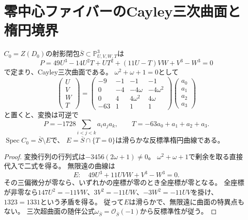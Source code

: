 \section{零中心ファイバーのCayley三次曲面と楕円境界}
\label{sec:quotient-cayley}
\begin{proposition}[選ばれた反標準因子を持つCayley表示]
$C_0=Z(D_0)$の射影閉包$\overline S\subset\mathbb P^3_{U,V,W,T}$は
\[
 P=49U^3-14U^2T+UT^2+(11U-T)VW+V^3-W^3=0
\]
で定まり、Cayley三次曲面である。
$\omega^2+\omega+1=0$として
\[
 \begin{pmatrix}U\\V\\W\\T\end{pmatrix}
 =\begin{pmatrix}
 -9&-1&-1&-1\\
 0&-4&-4\omega&-4\omega^2\\
 0&4&4\omega^2&4\omega\\
 -63&1&1&1
 \end{pmatrix}
 \begin{pmatrix}a_0\\a_1\\a_2\\a_3\end{pmatrix}
\]
と置くと、変換は可逆で
\[
 P=-1728\sum_{i<j<k}a_i a_j a_k,\qquad
 T=-63a_0+a_1+a_2+a_3.
\]
$\operatorname{Spec}C_0=\overline S\setminus E$で、
$E=\overline S\cap\{T=0\}$は滑らかな反標準楕円曲線である。
\end{proposition}
\begin{proof}
変換行列の行列式は$-3456(2\omega+1)\ne0$。
$\omega^2+\omega+1$で剰余を取る直接代入で二式を得る。
無限遠の曲線は
\[
 E:\quad49U^3+11UVW+V^3-W^3=0.
\]
その三偏微分が零なら、いずれかの座標が零のとき全座標が零となる。
全座標が非零なら$147U^2=-11VW$、$3V^2=-11UW$、$-3W^2=-11UV$を掛け、
$1323=1331$という矛盾を得る。
従って$E$は滑らかで、無限遠に曲面の特異点もない。
三次超曲面の随伴公式$\omega_{\overline S}=\mathcal O_{\overline S}(-1)$から反標準性が従う。
\end{proof}

